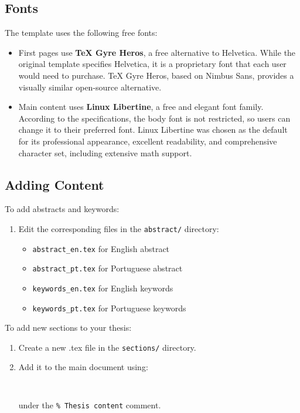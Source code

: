 \subsection{Fonts}
The template uses the following free fonts:
\begin{itemize}
    \item First pages use \textbf{TeX Gyre Heros}, a free alternative to Helvetica. While the original template specifies Helvetica, it is a proprietary font that each user would need to purchase. TeX Gyre Heros, based on Nimbus Sans, provides a visually similar open-source alternative.
    \item Main content uses \textbf{Linux Libertine}, a free and elegant font family. According to the specifications, the body font is not restricted, so users can change it to their preferred font. Linux Libertine was chosen as the default for its professional appearance, excellent readability, and comprehensive character set, including extensive math support.
\end{itemize}

\subsection{Adding Content}
To add abstracts and keywords:
\begin{enumerate}
    \item Edit the corresponding files in the \texttt{abstract/} directory:
    \begin{itemize}
        \item \texttt{abstract\_en.tex} for English abstract
        \item \texttt{abstract\_pt.tex} for Portuguese abstract
        \item \texttt{keywords\_en.tex} for English keywords
        \item \texttt{keywords\_pt.tex} for Portuguese keywords
    \end{itemize}
\end{enumerate}

To add new sections to your thesis:
\begin{enumerate}
    \item Create a new .tex file in the \texttt{sections/} directory.
    \item Add it to the main document using:
    \begin{verbatim}
    
    \end{verbatim}
    under the \texttt{\% Thesis content} comment.
\end{enumerate}


